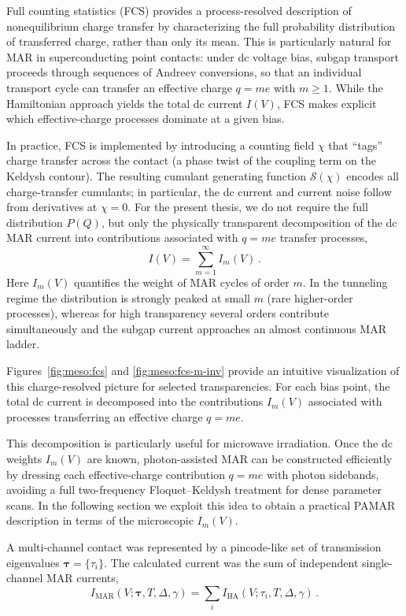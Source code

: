             Full counting statistics (FCS) provides a process-resolved description of nonequilibrium charge transfer by characterizing the full probability distribution of transferred charge, rather than only its mean. This is particularly natural for MAR in superconducting point contacts: under dc voltage bias, subgap transport proceeds through sequences of Andreev conversions, so that an individual transport cycle can transfer an effective charge $q=me$ with $m\ge 1$. While the Hamiltonian approach yields the total dc current $I(V)$, FCS makes explicit which effective-charge processes dominate at a given bias.

            In practice, FCS is implemented by introducing a counting field $\chi$ that ``tags'' charge transfer across the contact (a phase twist of the coupling term on the Keldysh contour). The resulting cumulant generating function $\mathcal S(\chi)$ encodes all charge-transfer cumulants; in particular, the dc current and current noise follow from derivatives at $\chi=0$. For the present thesis, we do not require the full distribution $P(Q)$, but only the physically transparent decomposition of the dc MAR current into contributions associated with $q=me$ transfer processes,
            \begin{equation}
                I(V)=\sum_{m=1}^{\infty} I_m(V)\,.
                \label{eq:meso:fcs-decomposition}
            \end{equation}
            Here $I_m(V)$ quantifies the weight of MAR cycles of order $m$. In the tunneling regime the distribution is strongly peaked at small $m$ (rare higher-order processes), whereas for high transparency several orders contribute simultaneously and the subgap current approaches an almost continuous MAR ladder.

            Figures~\ref{fig:meso:fcs} and \ref{fig:meso:fcs-m-inv} provide an intuitive visualization of this charge-resolved picture for selected transparencies. For each bias point, the total dc current is decomposed into the contributions $I_m(V)$ associated with processes transferring an effective charge $q=me$.

            This decomposition is particularly useful for microwave irradiation. Once the dc weights $I_m(V)$ are known, photon-assisted MAR can be constructed efficiently by dressing each effective-charge contribution $q=me$ with photon sidebands, avoiding a full two-frequency Floquet--Keldysh treatment for dense parameter scans. In the following section we exploit this idea to obtain a practical PAMAR description in terms of the microscopic $I_m(V)$.

            A multi-channel contact was represented by a pincode-like set of transmission eigenvalues $\boldsymbol{\tau}=\{\tau_i\}$. The calculated current was the sum of independent single-channel MAR currents,
            \begin{equation}
                I_\mathrm{MAR}(V;\boldsymbol{\tau},T,\Delta,\gamma)
                =
                \sum_i I_\mathrm{HA}(V;\tau_i,T,\Delta,\gamma)\,.
                \label{eq:meso:channel-sum}
            \end{equation}